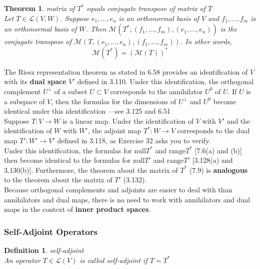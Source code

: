 \documentclass{article}
\newtheorem{theorem}{Theorem}[subsection]
\newtheorem{definition}{Definition}[subsection]
\newcommand{\range}{\text{range}}
\newcommand{\n}{\text{null}}
\begin{document}
\begin{CJK}{UTF8}{gkai}
\begin{theorem}
    matrix of $T^\ast$ equals conjugate transpose of matrix of $T$\\

    Let $T \in \mathcal{L}(V,W)$. Suppose $e_1,\ldots,e_n$ is an orthonormal basis of $V$ and $f_1, \ldots, f_m$ is an orthonormal basis of $W$. Then $\mathcal{M}(T^\ast,(f_1,\ldots, f_m ),(e_1,\ldots,e_n))$ is the conjugate transpose of $\mathcal{M}(T,(e_1,\ldots,e_n),(f_1,\ldots, f_m ))$. In other words,
    \[\mathcal{M}(T^\ast) = (\mathcal{M}(T))^\ast\]
\end{theorem}

The Riesz representation theorem as stated in 6.58 provides an identification of $V$ with its \textbf{dual space} $V'$ defined in 3.110. Under this identification, the orthogonal complement $U^\bot$ of a subset $U \subset V$ corresponds to the annihilator $U^0$ of $U$. If $U$ is a subspace of $V$, then the formulas for the dimensions of $U^\bot$ and $U^0$ become identical under this identification —see 3.125 and 6.51\\

Suppose $T: V \to W$ is a linear map. Under the identification of $V$ with $V'$ and the identification of $W$ with $W'$, the adjoint map $T^\ast: W \to V$ corresponds to the dual map $T': W' \to V'$ defined in 3.118, as Exercise 32 asks you to verify.\\

Under this identification, the formulas for $\n T^\ast$ and $\range T^\ast$ [7.6(a) and (b)] then become identical to the formulas for $\n  T'$ and $\range T'$ [3.128(a) and 3.130(b)]. Furthermore, the theorem about the matrix of $T^\ast$ (7.9) is \textbf{analogous} to the theorem about the matrix of $T'$ (3.132).\\

Because orthogonal complements and adjoints are easier to deal with than annihilators and dual maps, there is no need to work with annihilators and dual maps in the context of \textbf{inner product spaces}.\\

\subsubsection{Self-Adjoint Operators}

\begin{definition}
    self-adjoint\\
    
    An operator $T \in \mathcal{L}(V)$ is called self-adjoint if $T = T^\ast$
\end{definition}


\end{CJK}
\end{document}
